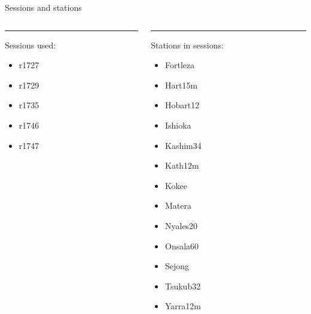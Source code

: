 \documentclass{beamer}
\begin{document}
    \begin{frame}{Sessions and stations}
        \begin{columns}[T] %
            \begin{column}{.48\textwidth}
            \color{black}\rule{\linewidth}{4pt}
                Sessions used:
                \begin{itemize}
                    \item r1727
                    \item r1729
                    \item r1735
                    \item r1746
                    \item r1747
                \end{itemize}

        \end{column}
        \hfill
        \begin{column}{.48\textwidth}
           \color{blue}\rule{\linewidth}{4pt}
                Stations in sessions:
                \begin{itemize}
                    \item Fortleza
                    \item Hart15m
                    \item Hobart12
                    \item Ishioka
                    \item Kashim34
                    \item Kath12m
                    \item Kokee
                    \item Matera
                    \item Nyales20
                    \item Onsala60
                    \item Sejong
                    \item Tsukub32
                    \item Yarra12m
                \end{itemize}

        \end{column}%
    \end{columns}
    \end{frame}
\end{document}
